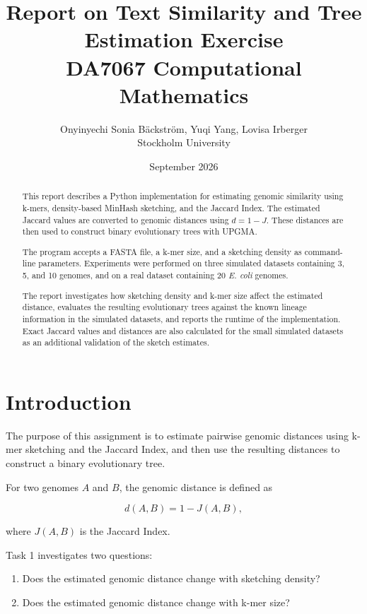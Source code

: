 \documentclass[11pt,a4paper]{article}
\title{\textbf{Report on Text Similarity and Tree Estimation Exercise}\\

\large DA7067 Computational Mathematics}
\author{ Onyinyechi Sonia Bäckström, Yuqi Yang, Lovisa Irberger\\
Stockholm University}
\date{September 2026}
\begin{document}
\maketitle
\newpage
\tableofcontents
\newpage
\begin{abstract}

This report describes a Python implementation for estimating genomic similarity
using k-mers, density-based MinHash sketching, and the Jaccard Index. The
estimated Jaccard values are converted to genomic distances using
$d=1-J$. These distances are then used to construct binary evolutionary trees
with UPGMA.

The program accepts a FASTA file, a k-mer size, and a sketching density as
command-line parameters. Experiments were performed on three simulated
datasets containing 3, 5, and 10 genomes, and on a real dataset containing
20 \textit{E. coli} genomes.

The report investigates how sketching density and k-mer size affect the
estimated distance, evaluates the resulting evolutionary trees against the
known lineage information in the simulated datasets, and reports the runtime
of the implementation. Exact Jaccard values and distances are also calculated
for the small simulated datasets as an additional validation of the sketch
estimates.

\end{abstract}
\newpage


\section{Introduction}

The purpose of this assignment is to estimate pairwise genomic distances using
k-mer sketching and the Jaccard Index, and then use the resulting distances to
construct a binary evolutionary tree.

For two genomes $A$ and $B$, the genomic distance is defined as

\begin{equation}
d(A,B)=1-J(A,B),
\end{equation}

where $J(A,B)$ is the Jaccard Index.

Task 1 investigates two questions:

\begin{enumerate}
    \item Does the estimated genomic distance change with sketching density?
    \item Does the estimated genomic distance change with k-mer size?
\end{enumerate}
\end{document}
